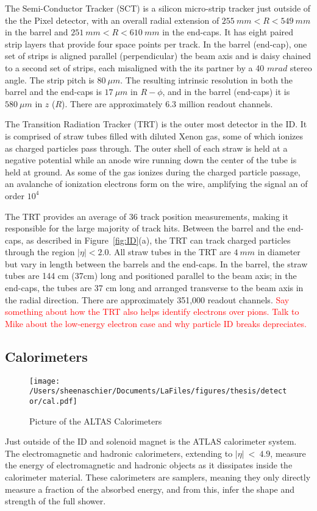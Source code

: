 The Semi-Conductor Tracker (SCT) is a silicon micro-strip tracker just outside of the the Pixel detector, with an overall radial extension of $255~mm < R < 549~mm$ in the barrel and $251~mm < R < 610~mm$ in the end-caps.  It has eight paired strip layers that provide four space points per track.  In the barrel (end-cap), one set of strips is aligned parallel (perpendicular) the beam axis and is daisy chained to a second set of strips, each misaligned with the its partner by a 40 $mrad$ stereo angle.  The strip pitch is $80~\mu m$.  The resulting intrinsic resolution in both the barrel and the end-caps is $17~\mu m$ in  $R-\phi$, and in the barrel (end-caps) it is $580~\mu m$ in $z$ ($R$).  There are approximately 6.3 million readout channels.

The Transition Radiation Tracker (TRT) is the outer most detector in the ID.  It is comprised of straw tubes filled with diluted Xenon gas, some of which ionizes as charged particles pass through.   The outer shell of each straw is held at a negative potential while an anode wire running down the center of the tube is held at ground.  As some of the gas ionizes during the charged particle passage, an avalanche of ionization electrons form on the wire, amplifying the signal an of order $10^4$   

The TRT provides an average of 36 track position measurements, making it responsible for the large majority of track hits.   Between the barrel and the end-caps, as described in Figure~\ref{fig:ID}(a), the TRT can track charged particles through the region $|\eta| < 2.0$.  All straw tubes in the TRT are $4~mm$ in diameter but vary in length between the barrels and the end-caps.  In the barrel, the straw tubes are 144 cm (37cm) long and positioned parallel to the beam axis; in the end-caps, the tubes are 37 cm long and arranged transverse to the beam axis in the radial direction.  There are approximately 351,000 readout channels.  \textcolor{red}{Say something about how the TRT also helps identify electrons over pions.  Talk to Mike about the low-energy electron case and why particle ID breaks depreciates.}

\FloatBarrier
\subsection{Calorimeters}
  \begin{figure}[tbp]
  \centering
 \texttt{[image: /Users/sheenaschier/Documents/LaFiles/figures/thesis/detector/cal.pdf]}
    \caption{Picture of the ALTAS Calorimeters}
   \label{fig:cal}
 \end{figure}
 Just outside of the ID and solenoid magnet is the ATLAS calorimeter system.  The electromagnetic and hadronic calorimeters, extending to $|\eta|~<~4.9$, measure the energy of electromagnetic and hadronic objects as it dissipates inside the calorimeter material.  These calorimeters are samplers, meaning they only directly measure a fraction of the absorbed energy, and from this, infer the shape and strength of the full shower.

